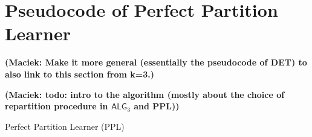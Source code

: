 \documentclass[a4paper,anonymous,USenglish]{lipics-v2019}
\newcommand{\PPL}{\textsc{PPL}\xspace}
\newcommand{\TAlg}{{\ensuremath{\textsf{ALG}_{3}}}\xspace}
\DeclarePairedDelimiter\set{\{}{\}}
\newcommand\maciek[1]{\color{brown}\textbf{(Maciek: #1)}\color{black}}
\begin{document}



\appendix

\section{Pseudocode of Perfect Partition Learner}

\maciek{Make it more general (essentially the pseudocode of DET) to also link to this section from k=3.}

\maciek{todo: intro to the algorithm (mostly about the choice of repartition procedure in \TAlg and PPL)}

\begin{algorithm}
	\renewcommand{\algorithmicrequire}{\textbf{Input:}}
	\renewcommand{\algorithmicensure}{\textbf{Output:}}
	\begin{algorithmic}
		\label{line:initcomponents}
		 \label{line:mergecomponents}
		\label{line:rebalance} 
		\ENDIF
		\ENDIF
		\ENDFOR
	\end{algorithmic}
	\caption{Perfect Partition Learner (\PPL)}
	\label{alg:ppl}
\end{algorithm}
\end{document}
